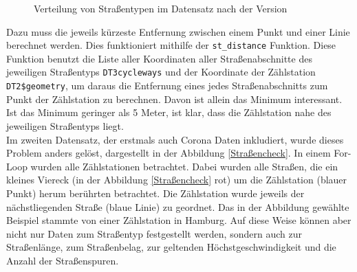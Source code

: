 \documentclass[a4paper,12pt]{thesis}
\begin{document}
\begin{figure}[!ht]%
	\centering
	\qquad
	\caption{Verteilung von Straßentypen im Datensatz nach der Version}
	\label{Straßentypen}%
\end{figure}

Dazu muss die jeweils kürzeste Entfernung zwischen einem Punkt und einer Linie berechnet werden. Dies funktioniert mithilfe der \lstinline|st_distance| Funktion. Diese Funktion benutzt die Liste aller Koordinaten aller Straßenabschnitte des jeweiligen Straßentyps \lstinline|DT3cycleways| und der Koordinate der Zählstation \lstinline|DT2$geometry|, um daraus die Entfernung eines jedes Straßenabschnitts zum Punkt der Zählstation zu berechnen. Davon ist allein das Minimum interessant. Ist das Minimum geringer als 5 Meter, ist klar, dass die Zählstation nahe des jeweiligen Straßentyps liegt.\\

Im zweiten Datensatz, der erstmals auch Corona Daten inkludiert, wurde dieses Problem anders gelöst, dargestellt in der Abbildung \ref{Straßencheck}. In einem For-Loop wurden alle Zählstationen betrachtet. Dabei wurden alle Straßen, die ein kleines Viereck (in der Abbildung \ref{Straßencheck} rot) um die Zählstation (blauer Punkt) herum berührten betrachtet. Die Zählstation wurde jeweils der nächstliegenden Straße (blaue Linie) zu geordnet. Das in der Abbildung gewählte Beispiel stammte von einer Zählstation in Hamburg. Auf diese Weise können aber nicht nur Daten zum Straßentyp festgestellt werden, sondern auch zur Straßenlänge, zum Straßenbelag, zur geltenden Höchstgeschwindigkeit und die Anzahl der Straßenspuren.\\
\end{document}
